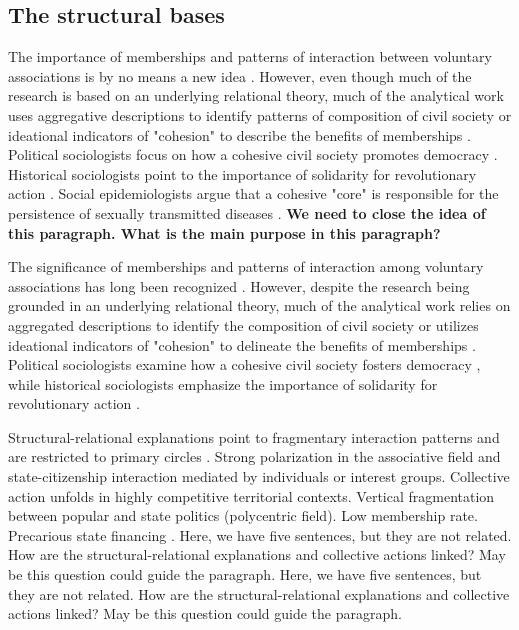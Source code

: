 \subsection{The structural bases}

The importance of memberships and patterns of interaction between voluntary associations is by no means a new idea \parencite{diani_cement_2015, sorenson_when_2014}. However, even though much of the research is based on an underlying relational theory, much of the analytical work uses aggregative descriptions to identify patterns of composition of civil society \parencite{salamon_social_1998} or ideational indicators of "cohesion" to describe the benefits of memberships \parencite{paxton_social_2002, paxton_association_2007,putnam_making_1994}. Political sociologists focus on how a cohesive civil society promotes democracy \parencite{paxton_is_1999, putnam_bowling_2000}.  Historical sociologists point to the importance of solidarity for revolutionary action \parencite{bearman_structure_1993, gould_multiple_1991}. Social epidemiologists argue that a cohesive "core" is responsible for the persistence of sexually transmitted diseases \parencite{rothenberg_personal_1996}. \textbf{We need to close the idea of this paragraph. What is the main purpose in this paragraph?}


\bigskip

{\color{blue} The significance of memberships and patterns of interaction among voluntary associations has long been recognized \parencite{diani_cement_2015, sorenson_when_2014}. However, despite the research being grounded in an underlying relational theory, much of the analytical work relies on aggregated descriptions to identify the composition of civil society \parencite{salamon_social_1998} or utilizes ideational indicators of "cohesion" to delineate the benefits of memberships \parencite{paxton_social_2002, paxton_association_2007,putnam_making_1994}. Political sociologists examine how a cohesive civil society fosters democracy \parencite{paxton_is_1999, putnam_bowling_2000}, while historical sociologists emphasize the importance of solidarity for revolutionary action \parencite{bearman_structure_1993, gould_multiple_1991}.}


\bigskip

Structural-relational explanations point to fragmentary interaction patterns and are restricted to primary circles \parencite{castells_globalizacion_2005}. Strong polarization in the associative field and state-citizenship interaction mediated by individuals or interest groups. Collective action unfolds in highly competitive territorial contexts. Vertical fragmentation between popular and state politics (polycentric field). Low membership rate. Precarious state financing \parencite{alenda__2013}. Here, we have five sentences, but they are not related. How are the structural-relational explanations and collective actions linked? May be this question could guide the paragraph. {\color{blue}Here, we have five sentences, but they are not related. How are the structural-relational explanations and collective actions linked? May be this question could guide the paragraph.}

